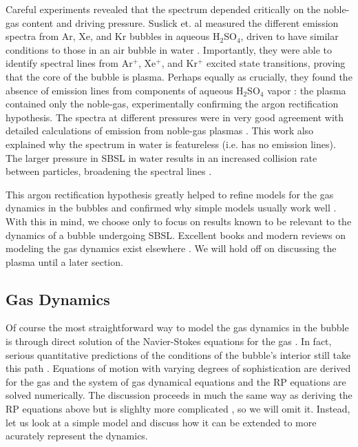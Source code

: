 \documentclass[11pt,prb,aps,nofootinbib,superscriptaddress,floatfix]{revtex4-2}
\begin{document}
Careful experiments revealed that the spectrum depended critically on the noble-gas content and driving pressure. Suslick et. al measured the different emission spectra from Ar, Xe, and Kr bubbles in aqueous H$_2$SO$_4$, driven to have similar conditions to those in an air bubble in water \cite{flannigan2005plasma,flannigan2006measurement,suslick2008inside}. Importantly, they were able to identify spectral lines from Ar$^+$, Xe$^+$, and Kr$^+$ excited state transitions, proving that the core of the bubble is plasma. Perhaps equally as crucially, they found the absence of emission lines from components of aqueous H$_2$SO$_4$ vapor \cite{suslick2008inside,flannigan2006measurement,flannigan2006measurement}: the plasma contained only the noble-gas, experimentally confirming the argon rectification hypothesis. The spectra at different pressures were in very good agreement with detailed calculations of emission from noble-gas plasmas \cite{an2009diagnosing,an2008spectral}. This work also explained why the spectrum in water is featureless (i.e. has no emission lines). The larger pressure in SBSL in water results in an increased collision rate between particles, broadening the spectral lines \cite{an2009diagnosing,suslick2008inside,flannigan2005plasma,flannigan2006measurement}.

This argon rectification hypothesis greatly helped to refine models for the gas dynamics in the bubbles and confirmed why simple models usually work well \cite{suslick2008inside,brenner2002single}. With this in mind, we choose only to focus on results known to be relevant to the dynamics of a bubble undergoing SBSL. Excellent books and modern reviews on modeling the gas dynamics exist elsewhere \cite{brenner2002single,yasui2018acoustic,brennen2014cavitation}. We will hold off on discussing the plasma until a later section. 

\subsection{Gas Dynamics}
Of course the most straightforward way to model the gas dynamics in the bubble is through direct solution of the Navier-Stokes equations for the gas \cite{brenner2002single}. In fact, serious quantitative predictions of the conditions of the bubble's interior still take this path \cite{an2006mechanism,an2008spectral,an2009diagnosing,flannigan2005plasma,flannigan2006measurement}. Equations of motion with varying degrees of sophistication are derived for the gas and the system of gas dynamical equations and the RP equations are solved numerically. The discussion proceeds in much the same way as deriving the RP equations above but is slighlty more complicated \cite{brenner2002single,yasui2018acoustic}, so we will omit it. Instead, let us look at a simple model and discuss how it can be extended to more acurately represent the dynamics.
\end{document}
